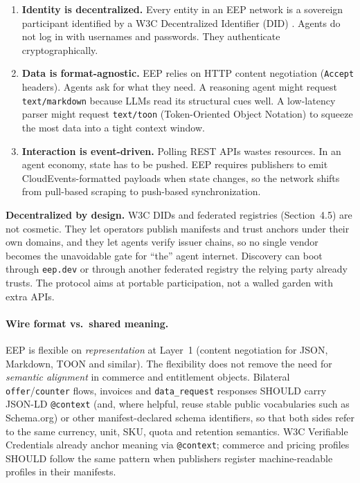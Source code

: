 \documentclass[12pt,a4paper]{article}
\begin{document}
\begin{enumerate}
    \item \textbf{Identity is decentralized.} Every entity in an EEP network is a sovereign participant identified by a W3C Decentralized Identifier (DID) \cite{ref5}. Agents do not log in with usernames and passwords. They authenticate cryptographically.
    \item \textbf{Data is format-agnostic.} EEP relies on HTTP content negotiation (\texttt{Accept} headers). Agents ask for what they need. A reasoning agent might request \texttt{text/markdown} because LLMs read its structural cues well. A low-latency parser might request \texttt{text/toon} (Token-Oriented Object Notation) to squeeze the most data into a tight context window.
    \item \textbf{Interaction is event-driven.} Polling REST APIs wastes resources. In an agent economy, state has to be pushed. EEP requires publishers to emit CloudEvents-formatted \cite{ref6} payloads when state changes, so the network shifts from pull-based scraping to push-based synchronization.
\end{enumerate}

\noindent\textbf{Decentralized by design.}
W3C DIDs and federated registries (Section~4.5) are not cosmetic. They let operators publish manifests and trust anchors under their own domains, and they let agents verify issuer chains, so no single vendor becomes the unavoidable gate for ``the'' agent internet. Discovery can boot through \texttt{eep.dev} or through another federated registry the relying party already trusts. The protocol aims at portable participation, not a walled garden with extra APIs.

\paragraph{Wire format vs.\ shared meaning.}
EEP is flexible on \emph{representation} at Layer~1 (content negotiation for JSON, Markdown, TOON and similar). The flexibility does not remove the need for \emph{semantic alignment} in commerce and entitlement objects. Bilateral \texttt{offer}/\texttt{counter} flows, invoices and \texttt{data\_request} responses SHOULD carry JSON-LD \texttt{@context} (and, where helpful, reuse stable public vocabularies such as Schema.org) or other manifest-declared schema identifiers, so that both sides refer to the same currency, unit, SKU, quota and retention semantics. W3C Verifiable Credentials already anchor meaning via \texttt{@context}; commerce and pricing profiles SHOULD follow the same pattern when publishers register machine-readable profiles in their manifests.
\end{document}
